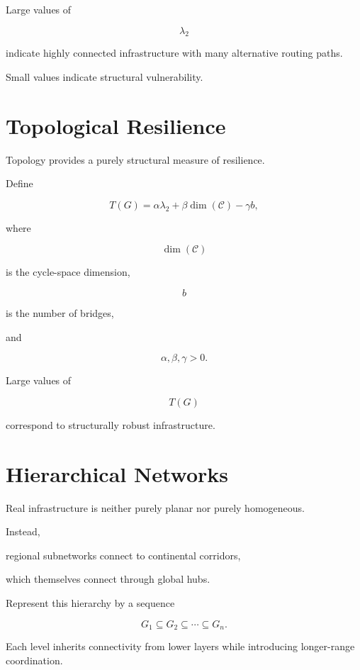 \documentclass[11pt,fleqn]{book}
\numberwithin{equation}{chapter}
\theoremstyle{plain}
\theoremstyle{definition}
\theoremstyle{remark}
\begin{document}
Large values of

\[
\lambda_2
\]

indicate highly connected infrastructure with many alternative routing
paths.

Small values indicate structural vulnerability.


\section{Topological Resilience}

Topology provides a purely structural measure of resilience.

Define

\[
T(G)
=
\alpha\lambda_2
+
\beta\dim(\mathcal C)
-
\gamma b,
\]

where

\[
\dim(\mathcal C)
\]

is the cycle-space dimension,

\[
b
\]

is the number of bridges,

and

\[
\alpha,\beta,\gamma>0.
\]

Large values of

\[
T(G)
\]

correspond to structurally robust infrastructure.


\section{Hierarchical Networks}

Real infrastructure is neither purely planar nor purely homogeneous.

Instead,

regional subnetworks connect to continental corridors,

which themselves connect through global hubs.

Represent this hierarchy by a sequence

\[
G_1
\subseteq
G_2
\subseteq
\cdots
\subseteq
G_n.
\]

Each level inherits connectivity from lower layers while introducing
longer-range coordination.

\end{document}
